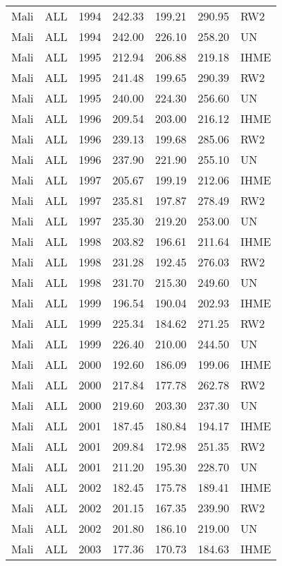 \begin{longtable}{lllrrrl}
  Mali & ALL & 1994 & 242.33 & 199.21 & 290.95 & RW2 \\ 
  Mali & ALL & 1994 & 242.00 & 226.10 & 258.20 & UN \\ 
  Mali & ALL & 1995 & 212.94 & 206.88 & 219.18 & IHME \\ 
  Mali & ALL & 1995 & 241.48 & 199.65 & 290.39 & RW2 \\ 
  Mali & ALL & 1995 & 240.00 & 224.30 & 256.60 & UN \\ 
  Mali & ALL & 1996 & 209.54 & 203.00 & 216.12 & IHME \\ 
  Mali & ALL & 1996 & 239.13 & 199.68 & 285.06 & RW2 \\ 
  Mali & ALL & 1996 & 237.90 & 221.90 & 255.10 & UN \\ 
  Mali & ALL & 1997 & 205.67 & 199.19 & 212.06 & IHME \\ 
  Mali & ALL & 1997 & 235.81 & 197.87 & 278.49 & RW2 \\ 
  Mali & ALL & 1997 & 235.30 & 219.20 & 253.00 & UN \\ 
  Mali & ALL & 1998 & 203.82 & 196.61 & 211.64 & IHME \\ 
  Mali & ALL & 1998 & 231.28 & 192.45 & 276.03 & RW2 \\ 
  Mali & ALL & 1998 & 231.70 & 215.30 & 249.60 & UN \\ 
  Mali & ALL & 1999 & 196.54 & 190.04 & 202.93 & IHME \\ 
  Mali & ALL & 1999 & 225.34 & 184.62 & 271.25 & RW2 \\ 
  Mali & ALL & 1999 & 226.40 & 210.00 & 244.50 & UN \\ 
  Mali & ALL & 2000 & 192.60 & 186.09 & 199.06 & IHME \\ 
  Mali & ALL & 2000 & 217.84 & 177.78 & 262.78 & RW2 \\ 
  Mali & ALL & 2000 & 219.60 & 203.30 & 237.30 & UN \\ 
  Mali & ALL & 2001 & 187.45 & 180.84 & 194.17 & IHME \\ 
  Mali & ALL & 2001 & 209.84 & 172.98 & 251.35 & RW2 \\ 
  Mali & ALL & 2001 & 211.20 & 195.30 & 228.70 & UN \\ 
  Mali & ALL & 2002 & 182.45 & 175.78 & 189.41 & IHME \\ 
  Mali & ALL & 2002 & 201.15 & 167.35 & 239.90 & RW2 \\ 
  Mali & ALL & 2002 & 201.80 & 186.10 & 219.00 & UN \\ 
  Mali & ALL & 2003 & 177.36 & 170.73 & 184.63 & IHME \\ 

\end{longtable}
